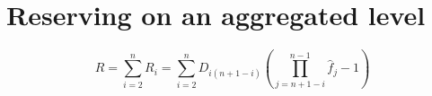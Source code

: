 \documentclass[11pt]{article}
\begin{document}
\maketitle %
\section{Reserving on an aggregated level}
$$
R=\sum_{i=2}^{n}R_{i}=\sum_{i=2}^{n}D_{i(n+1-i)}\left(\prod_{j=n+1-i}^{n-1}\hat{f}_{j}-1\right)
\label{(a0)}
$$
\end{document}
